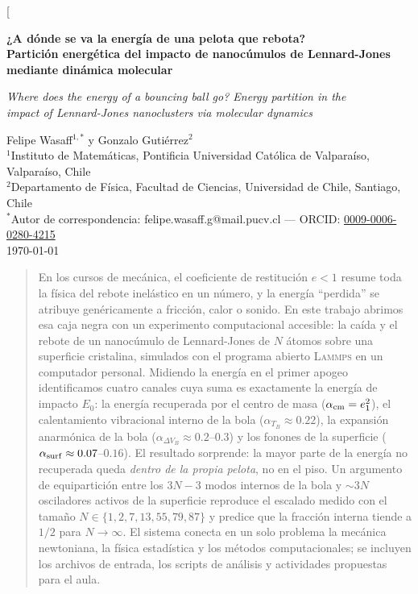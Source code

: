 \documentclass[10pt,a4paper,twocolumn]{article}
\newcommand{\lammps}{\textsc{Lammps}}
\begin{document}
\twocolumn[{%
\begin{center}
    {\LARGE\bfseries ¿A dónde se va la energía de una pelota que rebota?\\
    Partición energética del impacto de nanocúmulos de Lennard-Jones\\
    mediante dinámica molecular\par}
    \vspace{6pt}
    {\large\itshape Where does the energy of a bouncing ball go?
    Energy partition in the\\ impact of Lennard-Jones nanoclusters via
    molecular dynamics\par}
    \vspace{12pt}
    Felipe Wasaff$^{1,*}$ \quad y \quad Gonzalo Gutiérrez$^{2}$\\[4pt]
    {\small $^{1}$Instituto de Matemáticas, Pontificia Universidad
    Católica de Valparaíso, Valparaíso, Chile}\\
    {\small $^{2}$Departamento de Física, Facultad de Ciencias,
    Universidad de Chile, Santiago, Chile}\\[2pt]
    {\small $^{*}$Autor de correspondencia: felipe.wasaff.g@mail.pucv.cl
    --- ORCID: \href{https://orcid.org/0009-0006-0280-4215}%
    {0009-0006-0280-4215}}\\[4pt]
    {\small \today}
\end{center}
\vspace{8pt}
\begin{quotation}
\small
\noindent
En los cursos de mecánica, el coeficiente de restitución $e<1$ resume toda
la física del rebote inelástico en un número, y la energía ``perdida'' se
atribuye genéricamente a fricción, calor o sonido. En este trabajo abrimos
esa caja negra con un experimento computacional accesible: la caída y el
rebote de un nanocúmulo de Lennard-Jones de $N$ átomos sobre una superficie
cristalina, simulados con el programa abierto \lammps{} en un computador
personal. Midiendo la energía en el primer apogeo identificamos cuatro
canales cuya suma es exactamente la energía de impacto $E_0$: la energía
recuperada por el centro de masa ($\alpha_{\rm cm}=e_1^2$), el
calentamiento vibracional interno de la bola ($\alpha_{T_B}\approx0.22$),
la expansión anarmónica de la bola ($\alpha_{\Delta V_B}\approx0.2$--$0.3$)
y los fonones de la superficie ($\alpha_{\rm surf}\approx0.07$--$0.16$).
El resultado sorprende: la mayor parte de la energía no recuperada queda
\emph{dentro de la propia pelota}, no en el piso. Un argumento de
equipartición entre los $3N-3$ modos internos de la bola y $\sim3N$
osciladores activos de la superficie reproduce el escalado medido con el
tamaño $N\in\{1,2,7,13,55,79,87\}$ y predice que la fracción interna tiende
a $1/2$ para $N\to\infty$. El sistema conecta en un solo problema la
mecánica newtoniana, la física estadística y los métodos computacionales;
se incluyen los archivos de entrada, los scripts de análisis y actividades
propuestas para el aula.


\end{quotation}}
\end{document}
